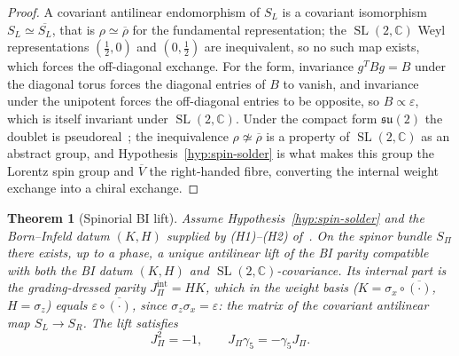 \documentclass[11pt,a4paper]{article}
\newtheorem{theorem}{Theorem}[section]
\theoremstyle{definition}
\theoremstyle{remark}
\newcommand{\SL}{\operatorname{SL}}
\begin{document}
    \begin{proof}
      A covariant antilinear endomorphism of $S_L$ is a covariant isomorphism
      $S_L \simeq \overline{S_L}$, that is $\rho \simeq \overline{\rho}$ for the fundamental
      representation; the $\SL(2,\mathbb{C})$ Weyl representations $(\tfrac12,0)$ and $(0,\tfrac12)$
      are inequivalent, so no such map exists, which forces the off-diagonal exchange.
      For the form, invariance $g^{T} B g = B$ under the diagonal torus forces the diagonal entries
      of $B$ to vanish, and invariance under the unipotent forces the off-diagonal entries to be
      opposite, so $B \propto \varepsilon$, which is itself invariant under $\SL(2,\mathbb{C})$.
      Under the compact form $\mathfrak{su}(2)$ the doublet is pseudoreal~\cite{FultonHarris1991}; the
      inequivalence $\rho \not\simeq \overline{\rho}$ is a property of $\SL(2,\mathbb{C})$ as an abstract group,
      and Hypothesis~\ref{hyp:spin-solder} is what makes this group the Lorentz spin group and
      $\overline{V}$ the right-handed fibre, converting the internal weight exchange into a chiral
      exchange.
    \end{proof}

    \begin{theorem}[Spinorial BI lift]
      \label{thm:spinorial-bi-lift}
      Assume Hypothesis~\ref{hyp:spin-solder} and the Born--Infeld datum $(K,H)$ supplied by
      (H1)--(H2) of~\cite{Beau2026a34}.
      On the spinor bundle $S_\Pi$ there exists, up to a phase, a unique antilinear lift of the BI parity
      compatible with both the BI datum $(K,H)$ and $\SL(2,\mathbb{C})$-covariance.
      Its internal part is the grading-dressed parity $J_\Pi^{\mathrm{int}} = H K$, which in the
      weight basis ($K = \sigma_x \circ \overline{(\cdot)}$, $H = \sigma_z$) equals
      $\varepsilon \circ \overline{(\cdot)}$, since $\sigma_z \sigma_x = \varepsilon$: the matrix of the
      covariant antilinear map $S_L \to S_R$.
      The lift satisfies
      \begin{equation}
        \label{eq:jpi-conditions}
        J_\Pi^2 = -1,
        \qquad
        J_\Pi \gamma_5 = -\gamma_5 J_\Pi .
      \end{equation}
    \end{theorem}
\end{document}
